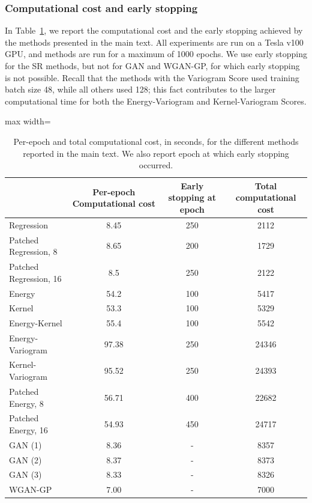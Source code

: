 \documentclass[twoside,11pt]{article}
\begin{document}
	
	\subsubsection{Computational cost and early stopping}\label{app:weatherbench_comp_cost}
	
	In Table~\ref{tab:comp_cost}, we report the computational cost and the early stopping achieved by the methods presented in the main text. All experiments are run on a Tesla v100 GPU, and methods are run for a maximum of 1000 epochs. We use early stopping for the SR methods, but not for GAN and WGAN-GP, for which early stopping is not possible.
	Recall that the methods with the Variogram Score used training batch size 48, while all others used 128; this fact contributes to the larger computational time for both the Energy-Variogram and Kernel-Variogram Scores. 
	
	
	\begin{table}[tb]
		\begin{center}
			\begin{adjustbox}{max width=\textwidth}
				\begin{tabular}{lccc}
					\toprule
					& Per-epoch Computational cost & Early stopping at epoch & Total computational cost \\
					\midrule
					Regression & 8.45 & 250  &  2112    \\
					Patched Regression, 8  & 8.65 & 200  &  1729    \\
					Patched Regression, 16 & 8.5 & 250  &  2122    \\
					Energy & 54.2 & 100  &  5417  \\
					Kernel & 53.3  &  100  &  5329  \\
					Energy-Kernel & 55.4 &  100  &   5542  \\
					Energy-Variogram & 97.38  &  250  & 24346    \\
					Kernel-Variogram & 95.52 &  250  &  24393   \\
					Patched Energy, 8 & 56.71  &   400 &  22682  \\
					Patched Energy, 16 & 54.93  &  450  &  24717   \\
					GAN (1) & 	8.36  &  -  & 8357   \\
					GAN (2) & 	8.37  &  -  & 8373   \\
					GAN (3) & 8.33  &  -  &    8326  \\
					WGAN-GP & 7.00  &  -  &  7000   \\
					\bottomrule
				\end{tabular}
			\end{adjustbox}
		\end{center}
		\caption{Per-epoch and total computational cost, in seconds, for the different methods reported in the main text. We also report epoch at which early stopping occurred.}
		\label{tab:comp_cost}
	\end{table}
	
\end{document}
